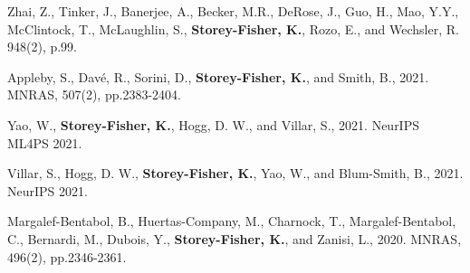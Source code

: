 \item[\arXiv{2203.08999}] Zhai, Z., Tinker, J., Banerjee, A., Becker, M.R., DeRose, J., Guo, H., Mao, Y.Y., McClintock, T., McLaughlin, S., \textbf{Storey-Fisher, K.}, Rozo, E., and Wechsler, R.  948(2), p.99.
\item[\arXiv{2102.10126}] Appleby, S., Davé, R., Sorini, D., \textbf{Storey-Fisher, K.}, and Smith, B., 2021.  MNRAS, 507(2), pp.2383-2404. 
\item[\arXiv{2110.03761}] Yao, W., \textbf{Storey-Fisher, K.}, Hogg, D. W., and Villar, S., 2021.  NeurIPS ML4PS 2021. 
\item[\arXiv{2106.06610}] Villar, S., Hogg, D. W., \textbf{Storey-Fisher, K.}, Yao, W., and Blum-Smith, B., 2021.  NeurIPS 2021.
\item[\arXiv{2003.08263}] Margalef-Bentabol, B., Huertas-Company, M., Charnock, T., Margalef-Bentabol, C., Bernardi, M., Dubois, Y., \textbf{Storey-Fisher, K.}, and Zanisi, L., 2020.  MNRAS, 496(2), pp.2346-2361.